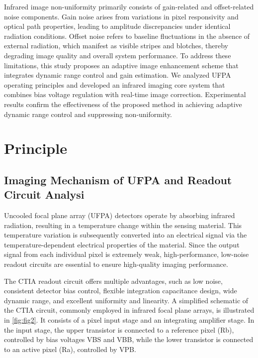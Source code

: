\documentclass[a4paper,fleqn]{cas-dc}
\begin{document}
Infrared image non-uniformity primarily consists of gain-related and offset-related noise components. Gain noise arises from variations in pixel responsivity and optical path properties, leading to amplitude discrepancies under identical radiation conditions. Offset noise refers to baseline fluctuations in the absence of external radiation, which manifest as visible stripes and blotches, thereby degrading image quality and overall system performance\citep{liu_scene-based_2024}.
To address these limitations, this study proposes an adaptive image enhancement scheme that integrates dynamic range control and gain estimation. We analyzed UFPA operating principles and developed an infrared imaging core system that combines bias voltage regulation with real-time image correction. Experimental results confirm the effectiveness of the proposed method in achieving adaptive dynamic range control and suppressing non-uniformity.

\section{Principle}
\subsection{Imaging Mechanism of UFPA and Readout Circuit Analysi}
\label{subsec1}

Uncooled focal plane array (UFPA) detectors operate by absorbing infrared radiation, resulting in a temperature change within the sensing material. This temperature variation is subsequently converted into an electrical signal via the temperature-dependent electrical properties of the material. Since the output signal from each individual pixel is extremely weak, high-performance, low-noise readout circuits are essential to ensure high-quality imaging performance.

The CTIA readout circuit offers multiple advantages, such as low noise, consistent detector bias control, flexible integration capacitance design, wide dynamic range, and excellent uniformity and linearity\citep{johnson_focal-plane_2009}. A simplified schematic of the CTIA circuit, commonly employed in infrared focal plane arrays, is illustrated in \cref{fig:fig2}. It consists of a pixel input stage and an integrating amplifier stage. In the input stage, the upper transistor is connected to a reference pixel (Rb), controlled by bias voltages VBS and VBB, while the lower transistor is connected to an active pixel (Ra), controlled by VPB.
\end{document}
